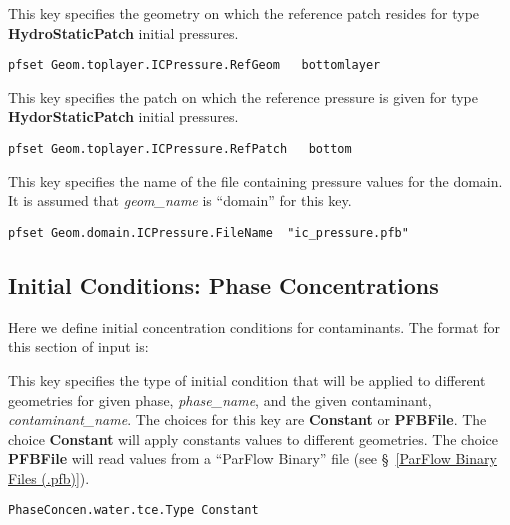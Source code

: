 {This key specifies the geometry on which the reference patch resides for type
{\bf HydroStaticPatch} initial pressures.
}
\begin{display}\begin{verbatim}
pfset Geom.toplayer.ICPressure.RefGeom   bottomlayer
\end{verbatim}\end{display}

{This key specifies the patch on which the reference pressure is given for type
{\bf HydorStaticPatch} initial pressures.
}
\begin{display}\begin{verbatim}
pfset Geom.toplayer.ICPressure.RefPatch   bottom
\end{verbatim}\end{display}

{This key specifies the name of the file containing pressure values for the
domain.  It is assumed that {\em geom\_name} is ``domain'' for this key.}
\begin{display}\begin{verbatim}
pfset Geom.domain.ICPressure.FileName  "ic_pressure.pfb"
\end{verbatim}\end{display}


\subsection{Initial Conditions: Phase Concentrations}
\label{Initial Conditions: Phase Concentrations}

Here we define initial concentration conditions for contaminants.
The format for this section of input is:

{
This key specifies the type of initial condition that will be applied
to different geometries for given phase, {\em phase\_name}, and the
given contaminant, {\em contaminant\_name}.  The choices for this key
are {\bf Constant} or {\bf PFBFile}.  The choice {\bf Constant} will
apply constants values to different geometries.  The choice
{\bf PFBFile}  will read values from a ``ParFlow Binary'' file
(see \S~\ref{ParFlow Binary Files (.pfb)}).
}
\begin{display}\begin{verbatim}
PhaseConcen.water.tce.Type Constant
\end{verbatim}\end{display}

